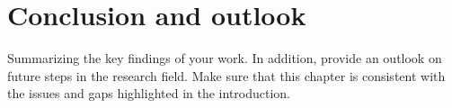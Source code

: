 \chapter{Conclusion and outlook}
{
    \color{orange}
    Summarizing the key findings of your work. 
    In addition, provide an outlook on future steps in the research field.
    Make sure that this chapter is consistent with the issues and gaps highlighted in the introduction. 
}